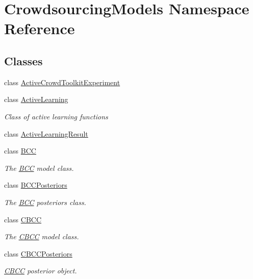 \hypertarget{namespace_crowdsourcing_models}{}\section{Crowdsourcing\+Models Namespace Reference}
\label{namespace_crowdsourcing_models}
\subsection*{Classes}
\begin{DoxyCompactItemize}
\item 
class \hyperlink{class_crowdsourcing_models_1_1_active_crowd_toolkit_experiment}{Active\+Crowd\+Toolkit\+Experiment}
\item 
class \hyperlink{class_crowdsourcing_models_1_1_active_learning}{Active\+Learning}
\begin{DoxyCompactList}\small\item\em Class of active learning functions \end{DoxyCompactList}\item 
class \hyperlink{class_crowdsourcing_models_1_1_active_learning_result}{Active\+Learning\+Result}
\item 
class \hyperlink{class_crowdsourcing_models_1_1_b_c_c}{B\+C\+C}
\begin{DoxyCompactList}\small\item\em The \hyperlink{class_crowdsourcing_models_1_1_b_c_c}{B\+C\+C} model class. \end{DoxyCompactList}\item 
class \hyperlink{class_crowdsourcing_models_1_1_b_c_c_posteriors}{B\+C\+C\+Posteriors}
\begin{DoxyCompactList}\small\item\em The \hyperlink{class_crowdsourcing_models_1_1_b_c_c}{B\+C\+C} posteriors class. \end{DoxyCompactList}\item 
class \hyperlink{class_crowdsourcing_models_1_1_c_b_c_c}{C\+B\+C\+C}
\begin{DoxyCompactList}\small\item\em The \hyperlink{class_crowdsourcing_models_1_1_c_b_c_c}{C\+B\+C\+C} model class. \end{DoxyCompactList}\item 
class \hyperlink{class_crowdsourcing_models_1_1_c_b_c_c_posteriors}{C\+B\+C\+C\+Posteriors}
\begin{DoxyCompactList}\small\item\em \hyperlink{class_crowdsourcing_models_1_1_c_b_c_c}{C\+B\+C\+C} posterior object. \end{DoxyCompactList}\item 

\end{DoxyCompactItemize}
